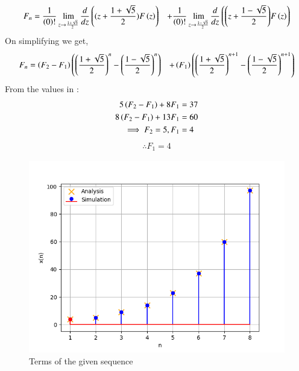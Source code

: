 \documentclass[journal,12pt]{IEEEtran}
\begin{document}
	\begin{align}
		F_n&=\frac{1}{\left(0\right)!}\lim\limits_{z\to {\frac{1+\sqrt{5}}{2}}}\frac{d}{dz}\left({(z+\frac{1+\sqrt{5}}{2})}F\left(z\right)\right) &+ \frac{1}{\left(0\right)!}\lim\limits_{z\to \frac{1-\sqrt{5}}{2}}\frac{d}{dz}\left({\left(z+\frac{1-\sqrt{5}}{2}\right)}F\left(z\right)\right)
	\end{align}
	On simplifying we get,
	\begin{align}
		F_n &= \left(F_2-F_1\right)\left(\left(\frac{1+\sqrt{5}}{2}\right)^n-\left(\frac{1-\sqrt{5}}{2}\right)^n\right) &+ \left(F_1\right)\left(\left(\frac{1+\sqrt{5}}{2}\right)^{n+1}-\left(\frac{1-\sqrt{5}}{2}\right)^{n+1}\right)
	\end{align}
	From the values in :
	\begin{align}
		5 \left(F_2-F_1\right) + 8 F_1 &=37\\
		8 \left(F_2-F_1\right) + 13 F_1 &=60\\
		\implies F_2 =5, F_1 &=4
	\end{align}
	\begin{align}
		\therefore {F_1=4}
	\end{align}
	\begin{figure}[ht]
		\includegraphics[width = \columnwidth]{figs/fig4}
		\caption{Terms of the given sequence}
		\centering
		\label{fig: fig4}
	\end{figure}
 
\end{document}
